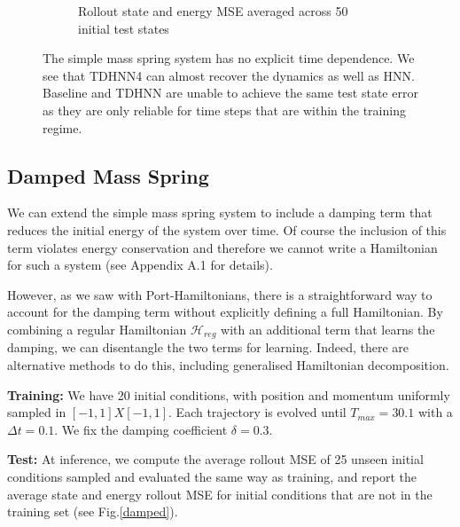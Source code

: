 \documentclass[twoside]{article}
\begin{document}
\begin{figure}[h!]
\begin{subfigure}[b]{0.48\textwidth}
		\caption{Rollout state and energy MSE averaged across 50 initial test states}
	\end{subfigure}
\caption{The simple mass spring system has no explicit time dependence. We see that TDHNN4 can almost recover the dynamics as well as HNN. Baseline and TDHNN are unable to achieve the same test state error as they are only reliable for time steps that are within the training regime.}
	\label{mspring}
\end{figure}


\subsection{Damped Mass Spring}

We can extend the simple mass spring system to include a damping term that reduces the initial energy of the system over time. Of course the inclusion of this term violates energy conservation and therefore we cannot write a Hamiltonian for such a system (see Appendix A.1 for details). 

However, as we saw with Port-Hamiltonians, there is a straightforward way to account for the damping term without explicitly defining a full Hamiltonian. By combining a regular Hamiltonian $\mathcal{H}_{reg}$ with an additional term that learns the damping, we can disentangle the two terms for learning. Indeed, there are alternative methods to do this, including generalised Hamiltonian decomposition.

\textbf{Training:} We have 20 initial conditions, with position and momentum uniformly sampled in $[-1,1]X[-1,1]$. Each trajectory is evolved until $T_{max} = 30.1$ with a $\Delta t = 0.1$. We fix the damping coefficient $\delta = 0.3$.

\textbf{Test:} At inference, we compute the average rollout MSE of 25 unseen initial conditions sampled and evaluated the same way as training, and report the average state and energy rollout MSE for initial conditions that are not in the training set (see Fig.\ref{damped}).
\end{document}
